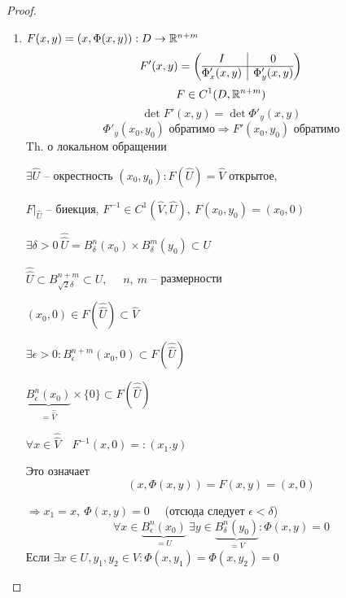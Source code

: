     \begin{proof}
        $ $
        \begin{enumerate}
            \item $F(x, y) = (x, \Phi(x, y)) : D \rightarrow \mathbb{R}^{n + m}$
                \[
                    F'(x, y) = \left(\begin{array}{@{}c|c@{}}
                        I & 0 \\
                        \hline
                        \Phi'_x(x, y) & \Phi'_y(x, y)
                      \end{array}\right)  
                \]
                \[
                      F \in C^1(D, \mathbb{R}^{n+m})
                \]
                \[
                      \det F'(x, y) = \det \Phi'_y(x, y)
                \]
                \[
                      \Phi'_y(x_0, y_0) \text{ обратимо} \Rightarrow F'(x_0, y_0) \text{ обратимо}
                \]
                Th. о локальном обращении
                \par $\exists \hat U$ -- окрестность $(x_0, y_0) : F(\hat U) = \hat V$ открытое,
                \par $F\big|_{\hat U}$ -- биекция, $F^{-1} \in C^1(\hat V, \hat U), \ F(x_0, y_0) = (x_0, 0)$
                \par $\exists \delta > 0 \ \hat{\hat U} = B_\delta^n(x_0) \times B_\delta^m(y_0) \subset U$
                \par $\hat{\hat U} \subset B_{\sqrt{2}\delta}^{n + m} \subset U, \quad$ $n, \ m$ -- размерности
                \par $(x_0, 0) \in F(\hat{\hat U}) \subset \hat V$
                \par $\exists \epsilon > 0 : B_\epsilon^{n+m}(x_0, 0) \subset F(\hat{\hat U})$
                \par $\underbrace{B^n_\epsilon(x_0)}_{= \hat{\hat V}} \times \{0\} \subset F(\hat{\hat U})$
                \par $\forall x \in \hat{\hat V} \quad F^{-1}(x, 0) =: (x_1. y)$
                \par Это означает
                \[
                      (x, \Phi(x, y)) = F(x, y) = (x, 0)
                \]
                \par $\Rightarrow x_1 = x, \ \Phi(x, y) = 0 \quad$ (отсюда следует $\epsilon < \delta$)
                \[
                      \forall x \in \underbrace{B_\epsilon^n(x_0)}_{= U} \ \exists y \in \underbrace{B_\delta^n(y_0)}_{= V} : \Phi(x, y) = 0
                \]
                Если $\exists x \in U, y_1, y_2 \in V : \Phi(x, y_1) = \Phi(x, y_2) = 0$

\end{enumerate}
\end{proof}

